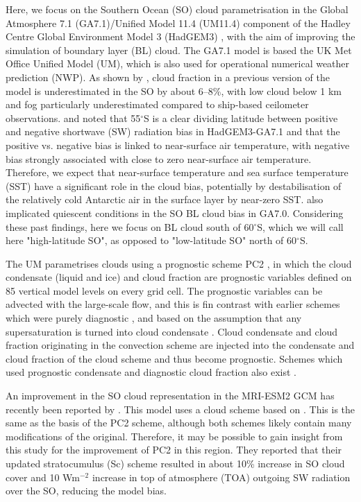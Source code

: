 Here, we focus on the Southern Ocean (SO) cloud parametrisation in the
Global Atmosphere 7.1 (GA7.1)/Unified Model 11.4 (UM11.4) component of the
Hadley Centre Global Environment Model 3 (HadGEM3) \citep{walters2019},
with the aim of improving the
simulation of boundary layer (BL) cloud. The GA7.1 model is based the  UK Met Office
Unified Model (UM), which is also used for operational numerical weather
prediction (NWP). As shown by \cite{kuma2019}, cloud
fraction in a previous version of the model is underestimated in the SO by about 6--8\%, with low cloud below 1 km
and fog particularly underestimated compared to ship-based ceilometer
observations. \cite{schuddeboom2019} and \cite{kuma2019} noted that 55$^\circ$S
is a clear dividing latitude between positive and negative shortwave (SW) radiation
bias in HadGEM3-GA7.1 and that the positive vs. negative bias is linked to
near-surface air temperature, with negative bias strongly associated with
close to zero near-surface air temperature. Therefore, we expect that
near-surface temperature and sea surface temperature (SST) have a significant role in the cloud bias,
potentially by destabilisation of the relatively cold Antarctic air in the surface
layer by near-zero SST. \cite{loveridge2019} also implicated quiescent conditions in the
SO BL cloud bias in GA7.0. Considering these past findings, here we focus
on BL cloud south of 60$^\circ$S, which we will call here
"high-latitude SO", as opposed to "low-latitude SO" north of 60$^\circ$S.

The UM parametrises clouds using a prognostic scheme PC2
\citep{wilson2008a,wilson2008b}, in which the cloud condensate (liquid and ice)
and cloud fraction are prognostic variables defined on 85 vertical model levels
on every grid cell. The prognostic variables can be advected with the
large-scale flow, and this is fin contrast with earlier schemes which were purely
diagnostic \citep{smith1990}, and based on the assumption that any
supersaturation is turned into cloud condensate \citep{jakob2000}. Cloud
condensate and cloud fraction originating in the convection scheme are injected
into the condensate and cloud fraction of the cloud scheme and thus become
prognostic. Schemes which
used prognostic condensate and diagnostic cloud fraction also exist
\citep{sundqvist1978,sundqvist1989}.

An improvement in the SO cloud representation in the MRI-ESM2 GCM has recently been
reported by \cite{kawai2019}. This model uses a cloud scheme based on
\cite{tiedtke1993}. This is the same as the basis of the PC2 scheme, although both
schemes likely contain many modifications of the original. Therefore, it may be
possible to gain insight from this study for the improvement of PC2 in this
region. They reported that their updated stratocumulus (Sc) scheme resulted in about
10\% increase in SO cloud cover and 10 Wm$^{-2}$ increase in top of atmosphere
(TOA) outgoing SW radiation over the SO, reducing the model bias.


